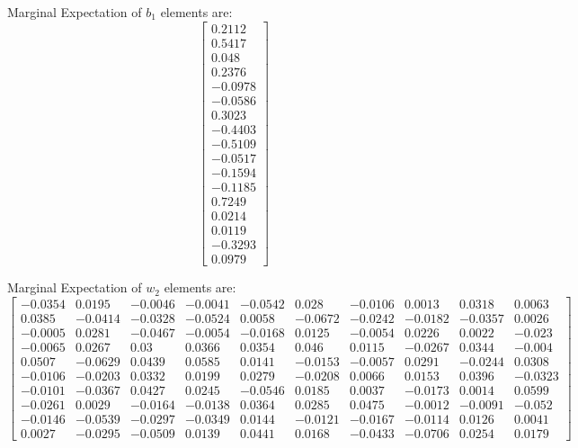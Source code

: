 \documentclass{article}
\begin{document}
Marginal Expectation of $b_1$ elements are:
\[
\begin{bmatrix}
0.2112 \\ 0.5417 \\ 0.048 \\ 0.2376 \\ -0.0978 \\ -0.0586 \\ 0.3023 \\ -0.4403 \\ -0.5109 \\
-0.0517\\
-0.1594\\
-0.1185\\
0.7249\\
0.0214\\
0.0119\\
-0.3293\\
0.0979
\end{bmatrix}
\]

Marginal Expectation of $w_2$ elements are:
\[
\begin{bmatrix}
-0.0354 &
0.0195&
-0.0046&
-0.0041&
-0.0542&
0.028&
-0.0106&
0.0013&
0.0318&
0.0063\\
0.0385&
-0.0414&
-0.0328&
-0.0524&
0.0058&
-0.0672&
-0.0242&
-0.0182&
-0.0357&
0.0026\\
-0.0005&
0.0281&
-0.0467&
-0.0054&
-0.0168&
0.0125&
-0.0054&
0.0226&
0.0022&
-0.023\\
-0.0065&
0.0267&
0.03&
0.0366&
0.0354&
0.046&
0.0115&
-0.0267&
0.0344&
-0.004\\
0.0507&
-0.0629&
0.0439&
0.0585&
0.0141&
-0.0153&
-0.0057&
0.0291&
-0.0244&
0.0308\\
-0.0106&
-0.0203&
0.0332&
0.0199&
0.0279&
-0.0208&
0.0066&
0.0153&
0.0396&
-0.0323\\
-0.0101&
-0.0367&
0.0427&
0.0245&
-0.0546&
0.0185&
0.0037&
-0.0173&
0.0014&
0.0599\\
-0.0261&
0.0029&
-0.0164&
-0.0138&
0.0364&
0.0285&
0.0475&
-0.0012&
-0.0091&
-0.052\\
-0.0146&
-0.0539&
-0.0297&
-0.0349&
0.0144&
-0.0121&
-0.0167&
-0.0114&
0.0126&
0.0041\\
0.0027&
-0.0295&
-0.0509&
0.0139&
0.0441&
0.0168&
-0.0433&
-0.0706&
0.0254&
0.0179

\end{bmatrix}
\]
\end{document}

